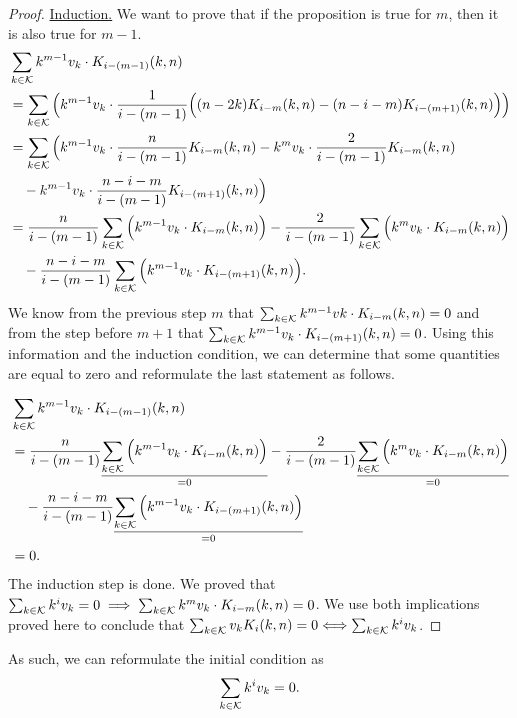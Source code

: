\begin{proof}
    \underline{Induction.} We want to prove that if the proposition is true for $m$, then it is also true for $m - 1$.
    \begin{equation*}
        \begin{split}
            & \sum_{k \in \mathcal{K}} k^{m-1}v_k \cdot K_{i-(m-1)}(k,n)\\
            &= \sum_{k \in \mathcal{K}} \Big( k^{m-1}v_k \cdot \frac{1}{i-(m-1)}\Big( (n-2k)K_{i-m}(k,n) - (n-i-m)K_{i-(m+1)}(k,n) \Big)\Big)\\
            &= \sum_{k \in \mathcal{K}} \Big( k^{m-1}v_k \cdot \frac{n}{i-(m-1)}K_{i-m}(k,n) - k^m v_k \cdot \frac{2}{i-(m-1)}K_{i-m}(k,n)\\
            &\quad -k^{m-1}v_k \cdot\frac{n-i-m}{i-(m-1)}K_{i-(m+1)}(k,n) \Big)\\
            &= \frac{n}{i-(m-1)}\sum_{k \in \mathcal{K}} \Big(k^{m-1}v_k\cdot K_{i-m}(k,n) \Big) - \frac{2}{i-(m-1)}\sum_{k \in \mathcal{K}} \Big(k^mv_k\cdot K_{i-m}(k,n)\Big)\\
            &\quad -\frac{n-i-m}{i-(m-1)}\sum_{k \in \mathcal{K}}\Big(k^{m-1}v_k\cdot K_{i-(m+1)}(k,n)\Big).
        \end{split}
    \end{equation*}
    We know from the previous step $m$ that $\sum_{k \in \mathcal{K}} k^{m-1}vk\cdot K_{i-m}(k,n) = 0$ and from the step before $m+1$ that $\sum_{k \in \mathcal{K}} k^{m-1}v_k\cdot K_{i-(m+1)}(k,n) = 0$. Using this information and the induction condition, we can determine that some quantities are equal to zero and reformulate the last statement as follows.

    \begin{equation*}
        \begin{split}
            & \sum_{k \in \mathcal{K}} k^{m-1}v_k \cdot K_{i-(m-1)}(k,n)\\
            &= \frac{n}{i-(m-1)}\underset{=0}{\underline{\sum_{k \in \mathcal{K}} \Big(k^{m-1}v_k\cdot K_{i-m}(k,n) \Big)}} - \frac{2}{i-(m-1)}\underset{=0}{\underline{\sum_{k \in \mathcal{K}} \Big(k^mv_k\cdot K_{i-m}(k,n)\Big)}}\\
            &\quad -\frac{n-i-m}{i-(m-1)}\underset{=0}{\underline{\sum_{k \in \mathcal{K}}\Big(k^{m-1}v_k\cdot K_{i-(m+1)}(k,n)\Big)}}\\
            &= 0.
        \end{split}
    \end{equation*}
    The induction step is done. We proved that $\sum_{k \in \mathcal{K}} k^iv_k = 0 \implies \sum_{k \in \mathcal{K}} k^mv_k\cdot K_{i-m}(k,n) = 0$.
    We use both implications proved here to conclude that $\sum_{k \in \mathcal{K}} v_kK_i(k,n) = 0 \Longleftrightarrow \sum_{k \in \mathcal{K}} k^iv_k$.
\end{proof}


As such, we can reformulate the initial condition as
\begin{equation}\label{eq:general}
    \sum_{k \in \mathcal{K}} k^iv_k = 0.
\end{equation}

